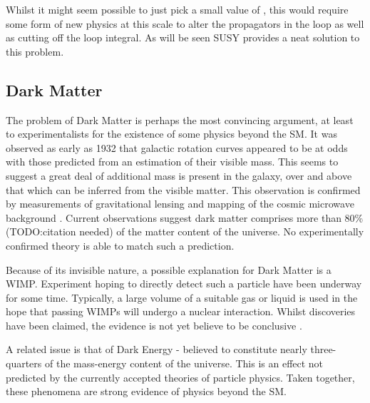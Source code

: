 Whilst it might seem possible to just pick a small value of \LambdaUV, this
would require some form of new physics at this scale to alter the propagators in
the loop as well as cutting off the loop integral. As will be seen \ac{SUSY}
provides a neat solution to this problem.

\subsection{Dark Matter}
The problem of Dark Matter is perhaps the most convincing argument, at least to
experimentalists for the existence of some physics beyond the \ac{SM}. It was
observed as early as 1932 \cite{darkmatter_review} that galactic rotation curves
appeared to be at odds with those predicted from an estimation of their visible
mass. This seems to suggest a great deal of additional mass is present in the
galaxy, over and above that which can be inferred from the visible matter. This
observation is confirmed by measurements of gravitational lensing
\cite{bullet_cluster} and mapping of the cosmic microwave background
\cite{wmap_7year}. Current observations suggest dark matter comprises more than
80\% (TODO:citation needed) of the matter content of the universe. No
experimentally confirmed theory is able to match such a prediction.

Because of its invisible nature, a possible explanation for Dark Matter is a
\acl{WIMP}. Experiment hoping to directly detect such a particle have been
underway for some time. Typically, a large volume of a suitable gas or liquid is
used in the hope that passing \acp{WIMP} will undergo a nuclear
interaction. Whilst discoveries have been claimed, the evidence is not yet
believe to be conclusive \cite{dama_libra}.

A related issue is that of Dark Energy - believed to constitute nearly
three-quarters of the mass-energy content of the universe. This is an effect not
predicted by the currently accepted theories of particle physics. Taken
together, these phenomena are strong evidence of physics beyond the \ac{SM}.

